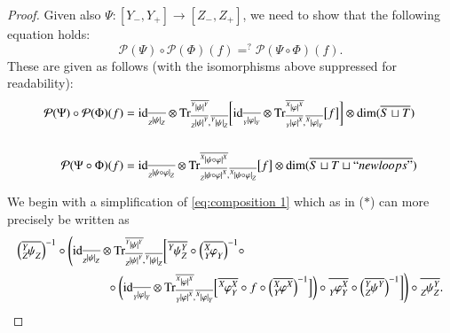 \documentclass{amsart}
\def\tn{\textnormal}
\def\mc{\mathcal}
\def\dim{\tn{dim}}
\def\Trace{\tn{Tr}}
\def\taking{\colon}
\def\too{\longrightarrow}
\def\ol{\overline}
\def\id{\tn{id}}
\def\mcP{\mc{P}}
\newcommand{\inp}[1]{{#1_-}}
\newcommand{\outp}[1]{{#1_+}}
\newcommand{\feeddd}[3]{{\tensor*[^{#2}_{\color{white}{!}}]{{|#1|}}{^{#3}}}}%
\newcommand{\feeddc}[3]{{\tensor*[^{#2}]{{|#1|}}{_{#3}}}}
\newcommand{\feedcd}[3]{{\tensor*[_{#2}]{{|#1|}}{^{#3}}}}
\newcommand{\feedcc}[3]{{\tensor*[^{\color{white}{!}}_{#2}]{{|#1|}}{_{#3}}}}
\newcommand{\feedda}[3]{{\tensor*[^{#2}_{\color{white}{!}}]{{#1}}{^{#2}_{#3}}}}
\newcommand{\feedca}[3]{{\tensor*[_{#2}]{{#1}}{_{#2}^{#3}}}}
\newcommand{\feedad}[3]{{\tensor*[^{#2}_{#3}]{{#1}}{^{#2}}}}
\newcommand{\feedac}[3]{{\tensor*[_{#2}^{#3}]{{#1}}{_{#2}}}}
\theoremstyle{remark}
\theoremstyle{definition}
\begin{document}
\begin{proof}
Given also $\Psi\taking[\inp{Y},\outp{Y}]\too[\inp{Z},\outp{Z}]$, we need to show that the following equation holds: 
$$\mcP(\Psi)\circ\mcP(\Phi)(f)=^?\mcP(\Psi\circ\Phi)(f).$$
These are given as follows (with the isomorphisms above suppressed for readability):
\begin{align}
\label{eq:composition 1}
\mcP(\Psi)\circ\mcP(\Phi)(f)&=
\id_{\ol{\feedcc{\psi}{Z}{Z}}}\otimes\Trace^{\ol{\feeddd{\psi}{Y}{Y}}}_{\ol{\feedcd{\psi}{Z}{Y}},\ol{\feeddc{\psi}{Y}{Z}}}
\bigg[
\id_{\ol{\feedcc{\varphi}{Y}{Y}}}\otimes\Trace^{\ol{\feeddd{\varphi}{X}{X}}}_{\ol{\feedcd{\varphi}{Y}{X}},\ol{\feeddc{\varphi}{X}{Y}}}\big[f\big]
\bigg]
\otimes\dim(\ol{S\sqcup T})
\\\nonumber\\
\label{eq:composition 2}
\mcP(\Psi\circ\Phi)(f)&=
\id_{\ol{\feedcc{\psi\circ\varphi}{Z}{Z}}}\otimes \Trace^{\ol{\feeddd{\psi\circ\varphi}{X}{X}}}_{\ol{\feedcd{\psi\circ\varphi}{Z}{X}},\ol{\feeddc{\psi\circ\varphi}{X}{Z}}}\big[f\big]\otimes\dim(\ol{S\sqcup T\sqcup ``newloops"})
\end{align}

We begin with a simplification of \eqref{eq:composition 1} which as in ($*$) can more precisely be written as
\begin{align*}
&\Big(\ol{\feedac{\psi}{Z}{Y}}\Big)^{-1}\circ\Bigg(\id_{\ol{\feedcc{\psi}{Z}{Z}}}\otimes\Trace^{\ol{\feeddd{\psi}{Y}{Y}}}_{\ol{\feedcd{\psi}{Z}{Y}},\ol{\feeddc{\psi}{Y}{Z}}}
\bigg[\ol{\feedda{\psi}{Y}{Z}}\circ\Big(\ol{\feedac{\varphi}{Y}{X}}\Big)^{-1}\circ\\
&\hspace{1in}\circ\bigg(\id_{\ol{\feedcc{\varphi}{Y}{Y}}}\otimes \Trace^{\ol{\feeddd{\varphi}{X}{X}}}_{\ol{\feedcd{\varphi}{Y}{X}},\ol{\feeddc{\varphi}{X}{Y}}}\Big[\ol{\feedda{\varphi}{X}{Y}}\circ f\circ\Big(\ol{\feedad{\varphi}{X}{Y}}\Big)^{-1}\Big]\bigg)\circ\ol{\feedca{\varphi}{Y}{X}}\circ\Big(\ol{\feedad{\psi}{Y}{Z}}\Big)^{-1}\bigg]\Bigg)\circ\ol{\feedca{\psi}{Z}{Y}}.
\end{align*}


\end{proof}
\end{document}
